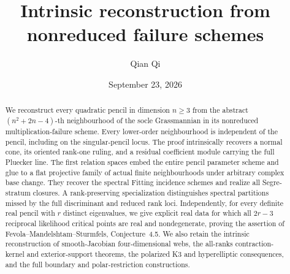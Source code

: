 \title[Intrinsic reconstruction from failure schemes]{Intrinsic reconstruction from nonreduced failure schemes}
\author{Qian Qi}
\date{September 23, 2026}
\begin{abstract}
We reconstruct every quadratic pencil in dimension \(n\ge3\)
from the abstract \((n^2+2n-4)\)-th neighbourhood of the socle
Grassmannian in its nonreduced multiplication-failure scheme.
Every lower-order neighbourhood is independent of the pencil,
including on the singular-pencil locus.  The proof intrinsically
recovers a normal cone, its oriented rank-one ruling, and a residual
coefficient module carrying the full Pluecker line.  The first
relation spaces embed the entire pencil parameter scheme and glue
to a flat projective family of actual finite neighbourhoods under
arbitrary complex base change.  They recover the spectral Fitting
incidence schemes and realize all Segre-stratum closures.  A
rank-preserving specialization distinguishes spectral partitions
missed by the full discriminant and reduced rank loci.  Independently,
for every definite real pencil with \(r\) distinct eigenvalues,
we give explicit real data for which all \(2r-3\) reciprocal
likelihood critical points are real and nondegenerate, proving the
assertion of Fevola--Mandelshtam--Sturmfels, Conjecture~4.5.  We also
retain the intrinsic reconstruction of smooth-Jacobian four-dimensional
webs, the all-ranks contraction-kernel and exterior-support theorems,
the polarized K3 and hyperelliptic consequences, and the full boundary
and polar-restriction constructions.
\end{abstract}
\maketitle
